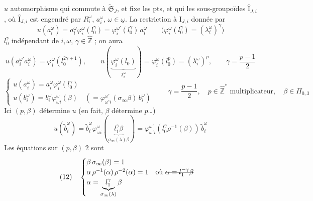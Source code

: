 \documentclass[11pt,a4paper]{article}
\begin{document}
 $u$  automorphisme  qui commute à $\widetilde{\mathfrak{S}}_J$, et fixe les pts,  et qui  \ill{} les sous-groupoïdes $\widehat{\mathrm{I}}_{J,i}$, où $\widehat{\mathrm{I}}_{J,i}$ est engendré par $R_i^{\omega}$, $a_i^{\omega}$, $\omega \in \underline{\omega}$. La restriction à $\mathrm{I}_{J,i}$   donnée par
\[
u(a_i^{\omega}) = a_i^{\omega} \varphi_i^{\omega}(l_0^{\gamma}) = \varphi_i^{\omega'}(l_0^{\gamma})\, a_i^{\omega}
\qquad \text{($\varphi_i^{\omega}(l_0^{\gamma}) = (\lambda_i^{\omega})^{\gamma}$)}
\]
$l_0^{\gamma}$ indépendant de $i, \omega$, $\gamma \in \hat{\mathbb{Z}}$ ; on aura
\[
u(a_i^{\omega'} a_i^{\omega}) = \varphi_i^{\omega}(l_0^{2\gamma+1}), \qquad
u(\underbrace{\varphi_i^{\omega}(l_0)}_{\lambda_i^{\omega}}) = \varphi_i^{\omega}(l_0^{p}) = (\lambda_i^{\omega})^{p},
\qquad \gamma = \frac{p-1}{2}
\]
\[
\begin{cases}
u(a_i^{\omega}) = a_i^{\omega} \varphi_i^{\omega}(l_0^{\gamma}) \\
u(b_i^{\omega}) = b_i^{\omega} \varphi^{\omega}_{\omega i}(\beta)
\quad (= \varphi^{\omega'}_{\omega' i}(\sigma_\infty \beta)\, b_i^{\omega})
\end{cases}
\qquad \gamma = \frac{p-1}{2}, \quad p \in \hat{\mathbb{Z}}^{*} \text{ multiplicateur}, \quad \beta \in \widehat{\Pi}_{0,3}
\]
Ici $(p, \beta)$ détermine $u$ (en fait, $\beta$ détermine $p$…)
\[
u(\tilde b_i^{\omega}) = \tilde b_i^{\omega} \varphi^{\omega}_{\omega i}(\underbrace{l_1^{\gamma} \beta}_{\sigma_\infty(\lambda) \beta})
= \varphi^{\omega'}_{\omega' i}(l_0^{\gamma} \rho^{-1}(\beta))\, \tilde b_i^{\omega}
\]
Les équations sur $(p, \beta)$  2 sont
\[
(12)\quad
\begin{cases}
\beta\, \sigma_\infty(\beta) = 1 \\
\alpha\, \rho^{-1}(\alpha)\, \rho^{-2}(\alpha) = 1
\quad \text{où } \text{\struck{$\alpha = l_1^{-\gamma} \beta$}} \\
\alpha = \underbrace{l_1^{\gamma}}_{\sigma_\infty(\lambda)} \beta
\end{cases}
\]
\end{document}
